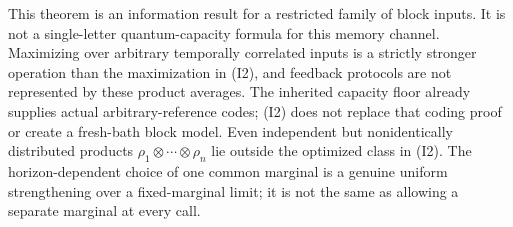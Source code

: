This theorem is an information result for a restricted family of block
inputs. It is not a single-letter quantum-capacity formula for this memory
channel. Maximizing over arbitrary temporally correlated inputs is a
strictly stronger operation than the maximization in (I2), and feedback
protocols are not represented by these product averages. The inherited
capacity floor already supplies actual arbitrary-reference codes; (I2)
does not replace that coding proof or create a fresh-bath block model.
Even independent but nonidentically distributed products
$\rho_1\otimes\cdots\otimes\rho_n$ lie outside the optimized class in
(I2). The horizon-dependent choice of one common marginal is a genuine
uniform strengthening over a fixed-marginal limit; it is not the same as
allowing a separate marginal at every call.

